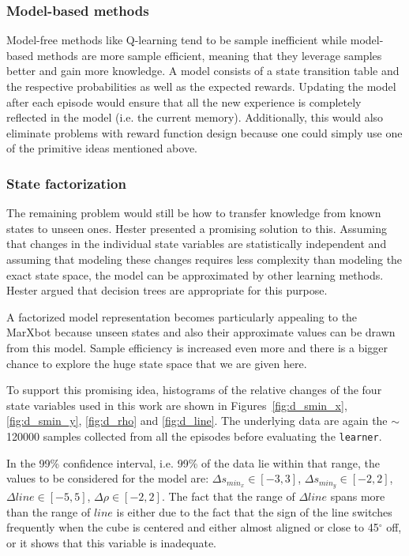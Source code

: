 \subsubsection{Model-based methods}
Model-free methods like Q-learning tend to be sample inefficient while model-based methods are more sample efficient, meaning that they leverage samples better and gain more knowledge. A model consists of a state transition table and the respective probabilities as well as the expected rewards. Updating the model after each episode would ensure that all the new experience is completely reflected in the model (i.e. the current memory). Additionally, this would also eliminate problems with reward function design because one could simply use one of the primitive ideas mentioned above.

\subsubsection{State factorization}
The remaining problem would still be how to transfer knowledge from known states to unseen ones. Hester \cite{hester2009generalized} presented a promising solution to this. Assuming that changes in the individual state variables are statistically independent and assuming that modeling these changes requires less complexity than modeling the exact state space, the model can be approximated by other learning methods. Hester argued that decision trees are appropriate for this purpose.

A factorized model representation becomes particularly appealing to the MarXbot because unseen states and also their approximate values can be drawn from this model. Sample efficiency is increased even more and there is a bigger chance to explore the huge state space that we are given here.

To support this promising idea, histograms of the relative changes of the four state variables used in this work are shown in Figures~\ref{fig:d_smin_x}, \ref{fig:d_smin_y}, \ref{fig:d_rho} and \ref{fig:d_line}. The underlying data are again the $\sim$120000 samples collected from all the episodes before evaluating the \texttt{learner}.

In the 99\% confidence interval, i.e. 99\% of the data lie within that range, the values to be considered for the model are: $\Delta s_{min_x} \in [-3, 3]$, $\Delta s_{min_y} \in [-2, 2]$, $\Delta line \in [-5, 5]$, $\Delta \rho \in [-2, 2]$. The fact that the range of $\Delta line$ spans more than the range of $line$ is either due to the fact that the sign of the line switches frequently when the cube is centered and either almost aligned or close to 45$^\circ$ off, or it shows that this variable is inadequate.

